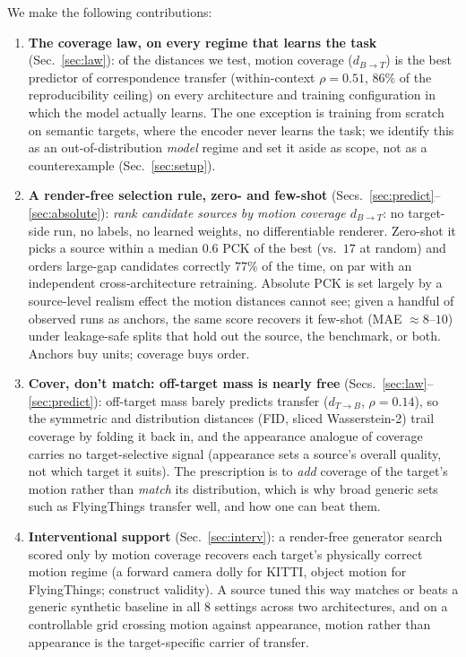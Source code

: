 \documentclass[runningheads]{llncs}
\newcommand{\dtb}{d_{T\to B}}
\newcommand{\dbt}{d_{B\to T}}
\newcommand{\pck}{PCK}
\begin{document}
We make the following contributions:
\begin{enumerate}
\item \textbf{The coverage law, on every regime that learns the task}
  (Sec.~\ref{sec:law}): of the distances we test, motion coverage ($\dbt$)
  is the best predictor of correspondence transfer (within-context
  $\rho{=}0.51$, $86\%$ of the reproducibility ceiling) on every architecture
  and training configuration in which the model actually learns. The one
  exception is training from scratch on semantic targets, where the encoder
  never learns the task; we identify this as an out-of-distribution
  \emph{model} regime and set it aside as scope, not as a counterexample
  (Sec.~\ref{sec:setup}).
\item \textbf{A render-free selection rule, zero- and few-shot}
  (Secs.~\ref{sec:predict}--\ref{sec:absolute}): \emph{rank candidate sources by
  motion coverage $\dbt$}: no target-side run, no labels, no learned weights, no
  differentiable renderer. Zero-shot it picks a source within a median $0.6$
  \pck{} of the best (vs.\ $17$ at random) and orders large-gap candidates
  correctly $77\%$ of the time, on par with an independent cross-architecture
  retraining. Absolute \pck{} is set largely by a source-level realism effect the
  motion distances cannot see; given a handful of observed runs as anchors, the
  same score recovers it few-shot (MAE ${\approx}8$--$10$) under leakage-safe
  splits that hold out the source, the benchmark, or both. Anchors buy units;
  coverage buys order.
\item \textbf{Cover, don't match: off-target mass is nearly free}
  (Secs.~\ref{sec:law}--\ref{sec:predict}): off-target mass barely predicts
  transfer ($\dtb$, $\rho{=}0.14$), so the symmetric and distribution
  distances (FID, sliced Wasserstein-2) trail coverage by folding it back
  in, and the appearance analogue of coverage carries no target-selective
  signal (appearance sets a source's overall quality, not which target it
  suits). The prescription is to \emph{add} coverage of the target's motion
  rather than \emph{match} its distribution, which is why broad generic sets
  such as FlyingThings transfer well, and how one can beat them.
\item \textbf{Interventional support} (Sec.~\ref{sec:interv}): a render-free
  generator search scored only by motion coverage recovers each target's
  physically correct motion regime (a forward camera dolly for KITTI, object
  motion for FlyingThings; construct validity). A source tuned this way matches
  or beats a generic synthetic baseline in all $8$ settings across two
  architectures, and on a controllable grid crossing motion against appearance,
  motion rather than appearance is the target-specific carrier of transfer.
\end{enumerate}
\end{document}
